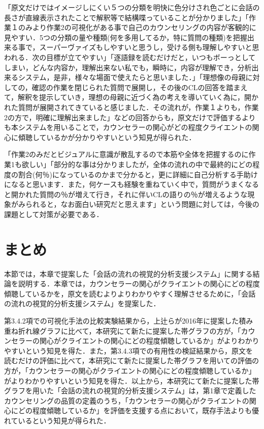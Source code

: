 \documentclass[shuuron]{kuee}
\begin{document}
「原文だけではイメージしにくい５つの分類を明快に色分けされ色ごとに会話の長さが直線表示されたことで解釈等で結構喋っていることが分かりました」「作業１のみより作業2の可視化がある事で自己のカウンセリングの内容が客観的に見やすい．5つの分類の量や種類(何を多用してるか，特に質問の種類)を把握出来る事で，スーパーヴァイズもしやすいと思うし，受ける側も理解しやすいと思われる．次の目標が立てやすい」「逐語録を読むだけだと，いつもボーっとしてしまい，どんな内容か，理解出来ない私でも，瞬時に，内容が理解でき，分析出来るシステム，是非，様々な場面で使えたらと思いました．」「理想像の母親に対しての，確認の作業を閉じられた質問で展開し，その後のCLの回答を踏まえて，解釈を提示していき，理想の母親に近づく為の考えを導いていく為に，開かれた質問が展開されてきていると感じました．その流れが，作業１よりも，作業2の方で，明確に理解出来ました」などの回答からも，原文だけで評価するよりも本システムを用いることで，カウンセラーの関心がどの程度クライエントの関心に傾聴しているかが分かりやすいという知見が得られた．

「作業2のみだとビジュアルに意識が散乱するので本筋や全体を把握するのに作業1も欲しい」「部分的な事は分かりましたが，全体の流れの中で最終的にどの程度の割合(何％)になっているのかまで分かると，更に詳細に自己分析する手助けになると思います．また，何ケースも経験を重ねていく中で，質問がうまくなると開かれた質問の％が増えて行き，それに伴いCLの語りの％が増えるような現象がみられると，なお面白い研究だと思えます」という問題に対しては，今後の課題として対策が必要である．


\section{まとめ}

本節では，本章で提案した「会話の流れの視覚的分析支援システム」に関する結論を説明する．本章では，カウンセラーの関心がクライエントの関心にどの程度傾聴しているかを，原文を読むよりよりわかりやすく理解させるために，「会話の流れの視覚的分析支援システム」を提案した．

第3.4.2項での可視化手法の比較実験結果から，上辻らが2016年に提案した積み重ね折れ線グラフに比べて，本研究にて新たに提案した帯グラフの方が，「カウンセラーの関心がクライエントの関心にどの程度傾聴しているか」がよりわかりやすいという知見を得た．また，第3.4.3項での有用性の検証結果から，原文を読むだけの評価に比べて，本研究にて新たに提案した帯グラフを用いての評価の方が，「カウンセラーの関心がクライエントの関心にどの程度傾聴しているか」がよりわかりやすいという知見を得た．以上から，本研究にて新たに提案した帯グラフを用いた「会話の流れの視覚的分析支援システム」は，第1章で定義したカウンセリングの品質の定義のうち，「カウンセラーの関心がクライエントの関心にどの程度傾聴しているか」を評価を支援する点において，既存手法よりも優れているという知見が得られた．
\end{document}
